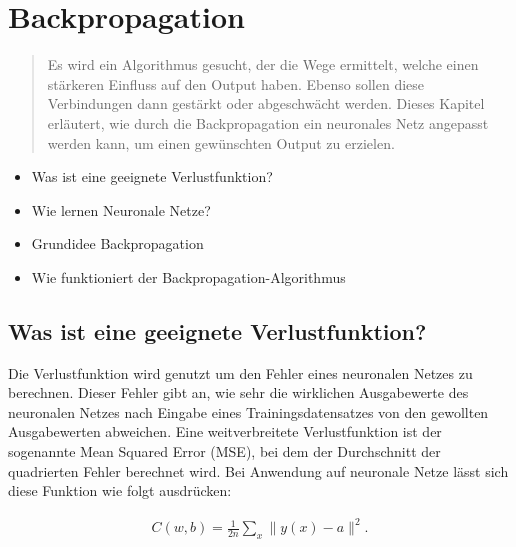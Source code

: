 
\thispagestyle{empty}
\section{Backpropagation}\label{sec:backpropagation}   

\vspace{1cm}
\begin{tcolorbox}[title={Inhalte der \textit{Backpropagation}}]
  \begin{quotation}\noindent
    Es wird ein Algorithmus gesucht, der die Wege ermittelt, welche einen stärkeren Einfluss auf den Output haben. Ebenso sollen diese Verbindungen dann gestärkt oder abgeschwächt werden.
    Dieses Kapitel erläutert, wie durch die Backpropagation ein neuronales Netz angepasst werden kann, um einen gewünschten Output zu erzielen. 
  \end{quotation}
  \begin{itemize}
    \item Was ist eine geeignete Verlustfunktion?
    \item Wie lernen Neuronale Netze?
    \item Grundidee Backpropagation
    \item Wie funktioniert der Backpropagation-Algorithmus
  \end{itemize}
\end{tcolorbox}

\subsection{Was ist eine geeignete Verlustfunktion?}\label{subsec:backpropagation:verlustfunktion}
Die Verlustfunktion wird genutzt um den Fehler eines neuronalen Netzes zu berechnen. Dieser Fehler gibt an, 
wie sehr die wirklichen Ausgabewerte des neuronalen Netzes nach Eingabe eines Trainingsdatensatzes von den gewollten Ausgabewerten abweichen. 
\bigbreak\noindent
Eine weitverbreitete Verlustfunktion ist der sogenannte Mean Squared Error (MSE), bei dem der Durchschnitt der quadrierten Fehler berechnet wird.
Bei Anwendung auf neuronale Netze lässt sich diese Funktion wie folgt ausdrücken:

\begin{eqnarray}  
  C(w,b) = \frac{1}{2n} \sum_x \| y(x) - a\|^2.
\end{eqnarray}

